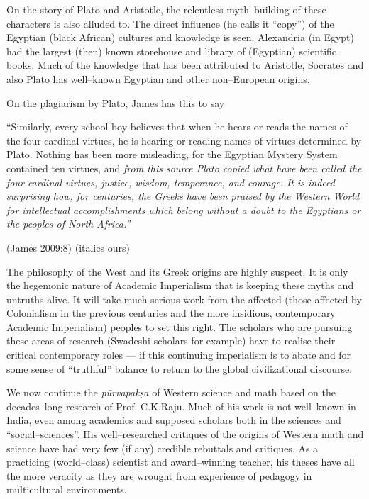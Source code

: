 On the story of Plato and Aristotle, the relentless myth–building of these characters is also alluded to. The direct influence (he calls it “copy”) of the Egyptian (black African) cultures and knowledge is seen. Alexandria (in Egypt) had the largest (then) known storehouse and library of (Egyptian) scientific books. Much of the knowledge that has been attributed to Aristotle, Socrates and also Plato has well–known Egyptian and other non–European origins.

On the plagiarism by Plato, James has this to say

\begin{myquote}
“Similarly, every school boy believes that when he hears or reads the names of the four cardinal virtues, he is hearing or reading names of virtues determined by Plato. Nothing has been more misleading, for the Egyptian Mystery System contained ten virtues, and \textit{from this source Plato copied what have been called the four cardinal virtues, justice, wisdom, temperance, and courage. It is indeed surprising how, for centuries, the Greeks have been praised by the Western World for intellectual accomplishments which belong without a doubt to the Egyptians or the peoples of North Africa.”}
\end{myquote}

\hfill (James 2009:8) (italics ours)

The philosophy of the West and its Greek origins are highly suspect. It is only the hegemonic nature of Academic Imperialism that is keeping these myths and untruths alive. It will take much serious work from the affected (those affected by Colonialism in the previous centuries and the more insidious, contemporary Academic Imperialism) peoples to set this right. The scholars who are pursuing these areas of research (Swadeshi scholars for example) have to realise their critical contemporary roles — if this continuing imperialism is to abate and for some sense of “truthful” balance to return to the global civilizational discourse.

\vskip 3pt

We now continue the \textit{pūrvapakṣa} of Western science and math based on the decades–long research of Prof. C.K.Raju. Much of his work is not well–known in India, even among academics and supposed scholars both in the sciences and “social–sciences”. His well–researched critiques of the origins of Western math and science have had very few (if any) credible rebuttals and critiques. As a practicing (world–class) scientist and award–winning teacher, his theses have all the more veracity as they are wrought from experience of pedagogy in multicultural environments.

